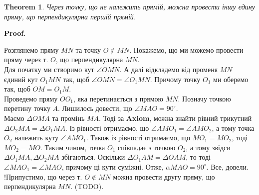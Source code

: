 \documentclass[a4paper, 10pt]{article}
\makeatletter
\def\qed{$\blacksquare$}
\theoremstyle{theoremdd}
\newtheorem{theorem}{Theorem}[subsection]
\theoremstyle{theoremdd}
\theoremstyle{theoremdd}
\theoremstyle{theoremdd}
\theoremstyle{theoremdd}
\theoremstyle{theoremdd}
\theoremstyle{theoremdd}
\theoremstyle{theoremdd}
\theoremstyle{theoremdd}
\newtheorem{corollary}[theorem]{Corollary}
\renewenvironment{proof}[1][Proof.\\]{\par
\pushQED{\hfill \qed}%
\normalfont \topsep6\p@\@plus6\p@\relax
\trivlist
\item\relax
{\bfseries
#1\@addpunct{.}}\hspace\labelsep\ignorespaces
}{%
\popQED\endtrivlist\@endpefalse
}
\makeatother
\begin{document}
\iffalse
\begin{corollary}
$\Delta A_1B_1C_1 = \Delta A_2B_2C_2 \iff$ кожний кут та кожна сторона першого трикутника дорівнює кожному куту та кожній стороні другого трикутника.
\end{corollary}

\textbf{Axiom.} Для заданого трикутника $ABC$ та заданого променя $A_1M$ існує трикутник $A_1B_1C_1$, який дорівнює $ABC$. Причому сторона $A_1B_1$ належить променю $A_1M$.
\bigskip \\
\textit{Треба трошки відволіктись та повернутись до перпендикулярних прямих.}
\fi

\begin{theorem}
Через точку, що не належить прямій, можна провести іншу єдину пряму, що перпендикулярна першій прямій.
\end{theorem}

\begin{proof}
Розглянемо пряму $MN$ та точку $O \not\in MN$. Покажемо, що ми можемо провести пряму через т. $O$, що перпендикулярна $MN$.\\
Для початку ми створимо кут $\angle OMN$. А далі відкладемо від променя $MN$ єдиний кут $O_1MN$ так, щоб $\angle OMN = \angle O_1MN$. Причому точку $O_1$ ми оберемо так, щоб $OM=O_1M$.\\
Проведемо пряму $OO_1$, яка перетинається з прямою $MN$. Позначу точкою перетину точку $A$. Лишилось довести, що $\angle MAO = 90^\circ$.\\
Маємо $\Delta OMA$ та промінь $MA$. Тоді за \textbf{Axiom}, можна знайти рівний трикутний $\Delta O_2MA = \Delta O_1MA$. Із рівності отримаємо, що $\angle AMO_1 = \angle AMO_2$, а тому точка $O_2$ належить куту $\angle AMO_1$. Також із рівності отримаємо, що $MO_1 = MO_2$, тоді $MO_2 = MO$. Таким чином, точка $O_1$ співпадає з точкою $O_2$, а тому звідси $\Delta O_1MA, \Delta O_2MA$ збігаються. Оскільки $\Delta O_1AM = \Delta OAM$, то тоді $\angle MAO_1 = \angle MAO$, причому ці кути суміжні. Отже, $\alpha MAO = 90^\circ$. Все, довели.
\bigskip \\
!Припустимо, що через т. $O \not \in MN$ можна провести другу пряму, що перпендикулярна $MN$. (TODO).
\end{proof}
\end{document}
